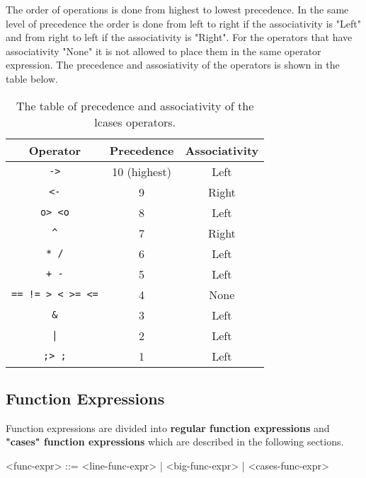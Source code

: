 \documentclass{article}
\begin{document}
\begin{table}[h]
\label{table:allops}

\end{table}
\newpage\noindent
The order of operations is done from highest to lowest precedence. In the same
level of precedence the order is done from left to right if the associativity
is "Left" and from right to left if the associativity is "Right". For the
operators that have associativity "None" it is not allowed to place them in the
same operator expression. The precedence and assosiativity of the operators
is shown in the table below.

\begin{table}[h]

\caption{ The table of precedence and associativity of the lcases operators.  }

\begin{center}
\begin{tabular}{ |c|c|c| }
\hline
Operator & Precedence & Associativity
\\
\hline
\hline
\verb|->| & 10 (highest) & Left
\\
\hline
\verb|<-| & 9 & Right
\\
\hline
\verb|o> <o| & 8 & Left
\\
\hline
\verb|^| & 7 & Right
\\
\hline
\verb|* /| & 6 & Left
\\
\hline
\verb|+ -| & 5 & Left
\\
\hline
\verb|== != > < >= <=| & 4 & None
\\
\hline
\verb|&| & 3 & Left
\\
\hline
\texttt{|} & 2 & Left
\\
\hline
\verb|;> ;| & 1 & Left
\\
\hline
\end{tabular}
\end{center}

\label{table:precassoc}

\end{table}

\newpage
\subsection{Function Expressions}
\label{subsec:funcexprs}

Function expressions are divided into \textbf{regular function expressions} and
\textbf{"cases" function expressions} which are described in the following
sections.
\begin{grammar}
<func-expr> ::= <line-func-expr> | <big-func-expr> | <cases-func-expr>
\end{grammar}
\end{document}
